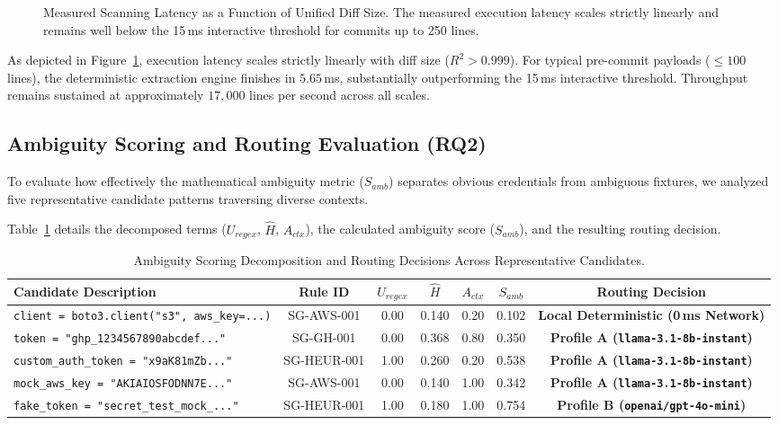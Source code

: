 \begin{figure}[h]
\centering

\caption{Measured Scanning Latency as a Function of Unified Diff Size. The measured execution latency scales strictly linearly and remains well below the 15\,ms interactive threshold for commits up to 250 lines.}
\label{fig:latency}
\end{figure}

As depicted in Figure~\ref{fig:latency}, execution latency scales strictly linearly with diff size ($R^2 > 0.999$). For typical pre-commit payloads ($\le 100$ lines), the deterministic extraction engine finishes in $5.65$\,ms, substantially outperforming the 15\,ms interactive threshold. Throughput remains sustained at approximately $17,000$ lines per second across all scales.

\subsection{Ambiguity Scoring and Routing Evaluation (RQ2)}
To evaluate how effectively the mathematical ambiguity metric ($S_{amb}$) separates obvious credentials from ambiguous fixtures, we analyzed five representative candidate patterns traversing diverse contexts.

Table~\ref{tab:routing} details the decomposed terms ($U_{regex}$, $\hat{H}$, $A_{ctx}$), the calculated ambiguity score ($S_{amb}$), and the resulting routing decision.

\begin{table}[t]
\centering
\caption{Ambiguity Scoring Decomposition and Routing Decisions Across Representative Candidates.}
\label{tab:routing}
\footnotesize
\setlength{\tabcolsep}{3.5pt}
\begin{tabular}{lcccccc}
\toprule
\textbf{Candidate Description} & \textbf{Rule ID} & \textbf{$U_{regex}$} & \textbf{$\hat{H}$} & \textbf{$A_{ctx}$} & \textbf{$S_{amb}$} & \textbf{Routing Decision} \\
\midrule
\texttt{client = boto3.client("s3", aws\_key=...)} & SG-AWS-001 & 0.00 & 0.140 & 0.20 & 0.102 & \textbf{Local Deterministic (0\,ms Network)} \\
\texttt{token = "ghp\_1234567890abcdef..."} & SG-GH-001 & 0.00 & 0.368 & 0.80 & 0.350 & \textbf{Profile A (\texttt{llama-3.1-8b-instant})} \\
\texttt{custom\_auth\_token = "x9aK81mZb..."} & SG-HEUR-001 & 1.00 & 0.260 & 0.20 & 0.538 & \textbf{Profile A (\texttt{llama-3.1-8b-instant})} \\
\texttt{mock\_aws\_key = "AKIAIOSFODNN7E..."} & SG-AWS-001 & 0.00 & 0.140 & 1.00 & 0.342 & \textbf{Profile A (\texttt{llama-3.1-8b-instant})} \\
\texttt{fake\_token = "secret\_test\_mock\_..."} & SG-HEUR-001 & 1.00 & 0.180 & 1.00 & 0.754 & \textbf{Profile B (\texttt{openai/gpt-4o-mini})} \\
\bottomrule
\end{tabular}
\end{table}

